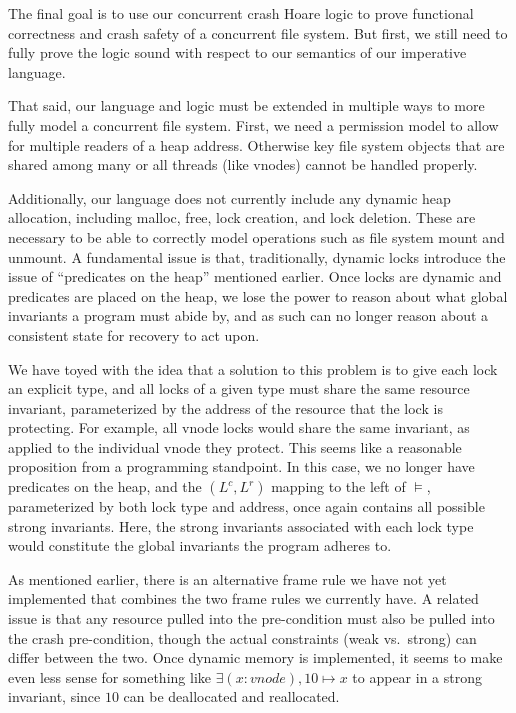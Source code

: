 
The final goal is to use our concurrent crash Hoare logic to prove
functional correctness and crash safety
of a concurrent file system.
But first,
we still need to fully prove the logic sound with respect to our
semantics of our imperative language.

That said, our language and logic must be extended in multiple ways to more
fully model a concurrent file system.
First, we need a
permission model to allow for multiple readers of a heap address.
Otherwise key file system objects that are shared among many or all
threads (like vnodes) cannot be handled properly.

Additionally, our language does not currently include any dynamic heap
allocation, including malloc, free, lock creation, and lock deletion.
These are
necessary to be able to correctly model operations such as file system mount and
unmount.
A fundamental issue is that, traditionally, dynamic locks introduce the
issue of ``predicates on the heap'' mentioned earlier.
Once locks are dynamic and
predicates are placed on the heap, we lose the power to reason about what global
invariants a program must abide by, and as such can no longer reason about a
consistent state for recovery to act upon.

We have toyed with the idea that a solution to this problem is to give each lock
an explicit type, and all locks of a given type must share the same resource
invariant, parameterized by the address of the resource that the lock is
protecting.
For example, all vnode locks would share the same invariant, as
applied to the individual vnode they protect.
This seems like a reasonable proposition from a programming standpoint.
In this case, we no longer have predicates on the heap, and the
$(L^c,L^r)$ mapping to the left of $\vDash$, parameterized by both lock type and
address, once again contains all possible strong invariants.
Here, the strong
invariants associated with each lock type would constitute the global invariants
the program adheres to.

As mentioned earlier, there is an alternative frame rule we have not
yet implemented that combines the two
frame rules we currently have.
A related
issue is that any resource pulled into the pre-condition must also be pulled
into the crash pre-condition, though the actual constraints (weak vs.\ strong)
can differ between the two.
Once dynamic memory is implemented, it seems to make
even less sense for something like $\exists (x:vnode), 10\mapsto x$ to appear in
a strong invariant, since $10$ can be deallocated and reallocated.

